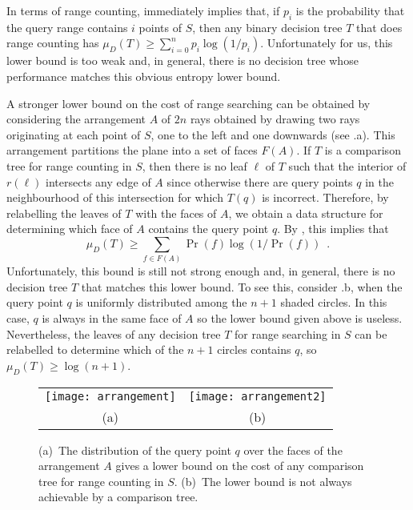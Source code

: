 \documentclass[lotsofwhite,charterfonts]{patmorin}
\begin{document}
In terms of range counting,  immediately implies that,
if $p_i$ is the probability that the query range contains $i$ points
of $S$, then any binary decision tree $T$ that does range counting has
$\mu_D(T) \ge \sum_{i=0}^{n} p_i\log(1/p_i)$.  Unfortunately for us,
this lower bound is too weak and, in general, there is no decision
tree whose performance matches this obvious entropy lower bound.

A stronger lower bound on the cost of range searching can be obtained
by considering the arrangement $A$ of $2n$ rays obtained by drawing
two rays originating at each point of $S$, one to the left and one
downwards (see .a).  This arrangement partitions
the plane into a set of faces $F(A)$.  If $T$ is a comparison tree for
range counting in $S$, then there is no leaf $\ell$ of $T$ such that
the interior of $r(\ell)$ intersects any edge of $A$ since otherwise
there are query points $q$ in the neighbourhood of this intersection
for which $T(q)$ is incorrect.  Therefore, by relabelling the leaves
of $T$ with the faces of $A$, we obtain a data structure for
determining which face of $A$ contains the query point $q$.
By , this implies that
\[
   \mu_D(T) \ge \sum_{f\in F(A)} \Pr(f)\log(1/\Pr(f)) \enspace .
\]
Unfortunately, this bound is still not strong enough and, in general,
there is no decision tree $T$ that matches this lower bound.  To see
this, consider .b, when the query point $q$ is
uniformly distributed among the $n+1$ shaded circles.  In this case, $q$ is
always in the same face of $A$ so the lower bound given above is
useless.  Nevertheless, the leaves of any decision tree
$T$ for range searching in $S$ can be relabelled to determine which of
the $n+1$ circles contains $q$, so $\mu_D(T) \ge \log(n+1)$.

\begin{figure}
  \begin{center}
    \begin{tabular}{cc}
      \texttt{[image: arrangement]} &
      \texttt{[image: arrangement2]} \\
        (a) & (b)
    \end{tabular}
  \end{center}
  \caption{(a)~The distribution of the query point $q$ over the faces
     of the arrangement $A$ gives a lower bound on the cost of any
     comparison tree for range counting in $S$. (b)~The lower bound is
     not always achievable by a comparison tree.}
\end{figure}
\end{document}
